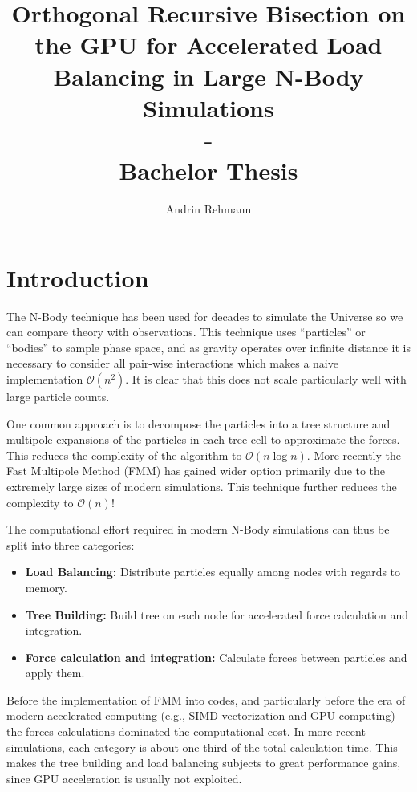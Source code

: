 \documentclass[]{article}
\title{Orthogonal Recursive Bisection on the GPU for Accelerated Load Balancing in Large N-Body Simulations \\ - \\ Bachelor Thesis}
\author{Andrin Rehmann}
\begin{document}
\maketitle

\newpage

\tableofcontents

\newpage
\section{Introduction}


The N-Body technique has been used for decades to simulate the Universe so we can compare theory with observations. This technique uses ``particles'' or ``bodies'' to sample phase space, and as gravity operates over infinite distance it is necessary to consider all pair-wise interactions which makes a naive implementation $\mathcal{O}(n^2)$.
It is clear that this does not scale particularly well with large particle counts.

One common approach is to decompose the particles into a tree structure and multipole expansions of the particles in each tree cell to approximate the forces. This reduces the complexity of the algorithm to $\mathcal{O}(n\log{}n)$. More recently the Fast Multipole Method (FMM) has gained wider option primarily due to the extremely large sizes of modern simulations. This technique further reduces the complexity to $\mathcal{O}(n)$!

The computational effort required in modern N-Body simulations can thus be split into three categories:

\begin{itemize}
	\item \textbf{Load Balancing:} Distribute particles equally among nodes with regards to memory.
	\item \textbf{Tree Building:} Build tree on each node for accelerated force calculation and integration.
	\item \textbf{Force calculation and integration:} Calculate forces between particles and apply them.
\end{itemize}

Before the implementation of FMM into codes, and particularly before the era of modern accelerated computing (e.g., SIMD vectorization and GPU computing) the forces calculations dominated the computational cost. In more recent simulations, each category is about one third of the total calculation time\cite{2017ComAC...4....2P}. This makes the tree building and load balancing subjects to great performance gains, since GPU acceleration is usually not exploited. 
\end{document}
